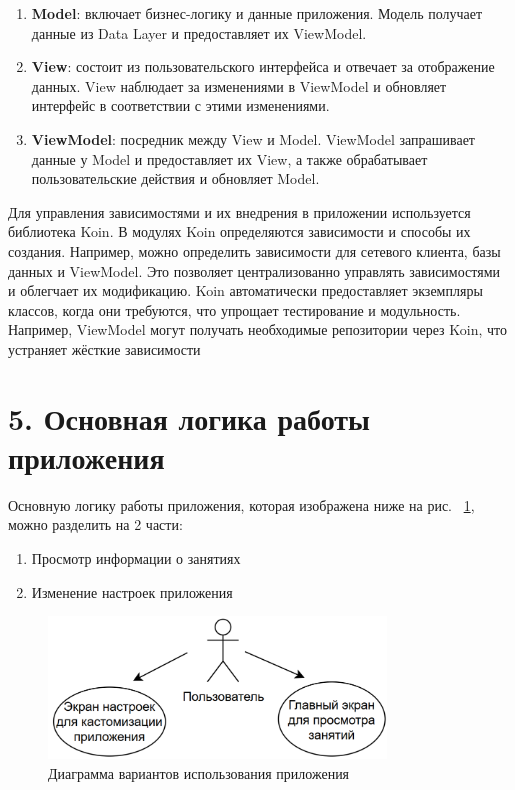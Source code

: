 \documentclass{vsureport}
\begin{document}
\begin{enumerate}
    \item \textbf{Model}: включает бизнес-логику и данные приложения. Модель получает данные из Data Layer и предоставляет их ViewModel.
    \item \textbf{View}: состоит из пользовательского интерфейса и отвечает за отображение данных. View наблюдает за изменениями в ViewModel и обновляет интерфейс в соответствии с этими изменениями.
    \item \textbf{ViewModel}: посредник между View и Model. ViewModel запрашивает данные у Model и предоставляет их View, а также обрабатывает пользовательские действия и обновляет Model.
\end{enumerate}

Для управления зависимостями и их внедрения в приложении используется библиотека Koin. В модулях Koin определяются зависимости и способы их создания. Например, можно определить зависимости для сетевого клиента, базы данных и ViewModel. Это позволяет централизованно управлять зависимостями и облегчает их модификацию. Koin автоматически предоставляет экземпляры классов, когда они требуются, что упрощает тестирование и модульность. Например, ViewModel могут получать необходимые репозитории через Koin, что устраняет жёсткие зависимости\cite{ref10}

\newpage
\section*{5. Основная логика работы приложения}
Основную логику работы приложения, которая изображена ниже на рис. ~\ref{fig:fig10}, можно разделить на 2 части:
\begin{enumerate}
	\item Просмотр информации о занятиях
	\item Изменение настроек приложения
\end{enumerate}

\begin{figure}[H]
	\centering
	\includegraphics[width=0.8\textwidth]{10.png}
	\caption{Диаграмма вариантов использования приложения}
	\label{fig:fig10}
\end{figure} 
\end{document}
